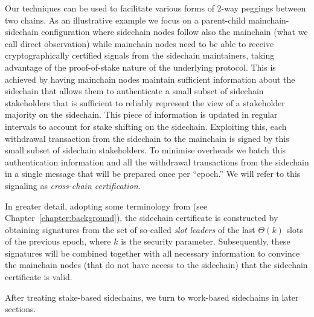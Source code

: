 Our techniques can be used to facilitate various forms of 2-way peggings
between two chains. As an illustrative example we focus on a parent-child
mainchain-sidechain
configuration where sidechain nodes follow also the mainchain (what we call direct observation) while mainchain nodes need to be able to receive cryptographically
certified signals
from the sidechain maintainers,
taking advantage of the proof-of-stake nature of the underlying protocol. This is achieved by having
mainchain nodes maintain sufficient information about the sidechain that allows
them to authenticate a
small subset of  sidechain stakeholders that is sufficient to
reliably represent the view of a stakeholder majority on the sidechain.
This piece of information is updated in regular intervals to account
for  stake shifting on the sidechain.
Exploiting this, each withdrawal  transaction from the sidechain to the mainchain
is signed by this  small subset of sidechain stakeholders.
To minimise overheads we batch this authentication information and all the withdrawal transactions from
the sidechain in a single message that will be prepared once per ``epoch.'' We will
refer to this signaling  as
 {\em cross-chain certification}.

In greater detail, adopting some terminology  from \cite{ouroboros} (see Chapter~\ref{chapter:background}),
the sidechain certificate  is constructed by obtaining
signatures  from the set of so-called \emph{slot leaders} of the last
$\Theta(k)$ slots of the previous epoch, where $k$ is the security parameter.
Subsequently, these signatures will be combined together with all necessary
information to convince the mainchain nodes (that do not have access to the
sidechain) that the sidechain certificate is valid.

After treating stake-based sidechains, we turn to work-based sidechains in later
sections.
